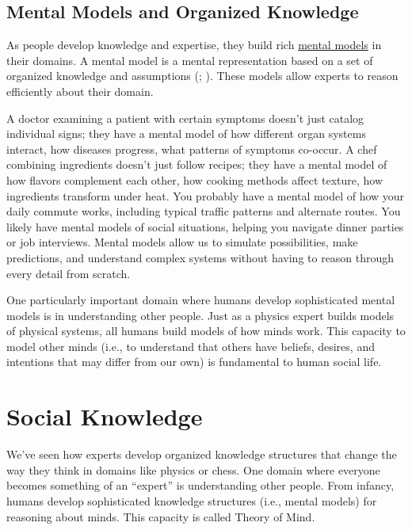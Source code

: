 \documentclass[
]{krantz}
\begin{document}
\subsection*{Mental Models and Organized Knowledge}\label{mental-models-and-organized-knowledge}


As people develop knowledge and expertise, they build rich \hyperref[mental-model]{mental models} in their domains. A mental model is a mental representation based on a set of organized knowledge and assumptions (; ). These models allow experts to reason efficiently about their domain.

A doctor examining a patient with certain symptoms doesn't just catalog individual signs; they have a mental model of how different organ systems interact, how diseases progress, what patterns of symptoms co-occur. A chef combining ingredients doesn't just follow recipes; they have a mental model of how flavors complement each other, how cooking methods affect texture, how ingredients transform under heat. You probably have a mental model of how your daily commute works, including typical traffic patterns and alternate routes. You likely have mental models of social situations, helping you navigate dinner parties or job interviews. Mental models allow us to simulate possibilities, make predictions, and understand complex systems without having to reason through every detail from scratch.

One particularly important domain where humans develop sophisticated mental models is in understanding other people. Just as a physics expert builds models of physical systems, all humans build models of how minds work. This capacity to model other minds (i.e., to understand that others have beliefs, desires, and intentions that may differ from our own) is fundamental to human social life.

\section{Social Knowledge}\label{social-knowledge}

We've seen how experts develop organized knowledge structures that change the way they think in domains like physics or chess. One domain where everyone becomes something of an ``expert'' is understanding other people. From infancy, humans develop sophisticated knowledge structures (i.e., mental models) for reasoning about minds. This capacity is called Theory of Mind.
\end{document}
